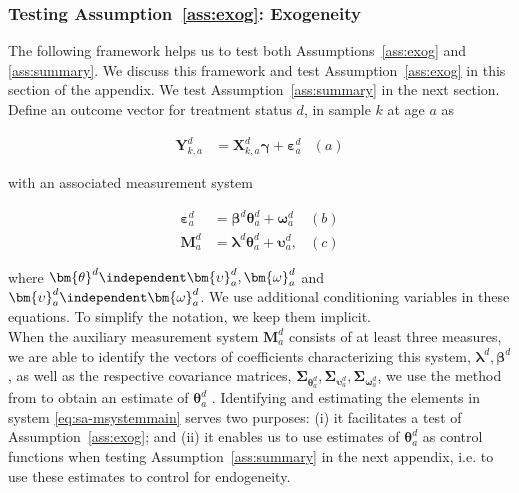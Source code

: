 \subsubsection{Testing Assumption~\ref{ass:exog}: Exogeneity} \label{app:endogeneity}

\noindent The following framework helps us to test both Assumptions~\ref{ass:exog} and \ref{ass:summary}. We discuss this framework and test Assumption~\ref{ass:exog} in this section of the appendix. We test Assumption~\ref{ass:summary} in the next section.\\

\noindent Define an outcome vector for treatment status $d$, in sample $k$ at age $a$ as

\begin{align}
\bm{Y}^d_{k,a} &= \bm{X}^d_{k,a} \bm{\gamma} + \bm{\varepsilon}^d_a  &(a) \nonumber
\end{align}

\noindent with an associated measurement system

\begin{align}  \label{eq:sa-msystemmain}
\bm{\varepsilon}_{a}^d &=\bm{\beta}^d \bm{\theta}_{a}^d + \bm{\omega}_{a}^d  &(b) \nonumber \\
\bm{M}_{a}^d &= \bm{\lambda}^d \bm{\theta}_{a}^d + \bm{\upsilon}_a^d,  &(c)
\end{align}


\noindent where $\bm{\theta}^d \independent \bm{\upsilon}_{a}^d, \bm{\omega}_{a}^d$ and $\bm{\upsilon}_{a}^d \independent \bm{\omega}_{a}^d$. We use additional conditioning variables in these equations. To simplify the notation, we keep them implicit.\\

\noindent When the auxiliary measurement system $\bm{M}_{a}^d $ consists of at least three measures, we are able to identify the vectors of coefficients characterizing this system, $\bm{\lambda}^d, \bm{\beta}^d$, as well as the respective covariance matrices, $\bm{\Sigma}_{\bm{\theta}_{a}^d}, \bm{\Sigma}_{\bm{\upsilon}_{a}^d}, \bm{\Sigma}_{\bm{\omega}_{a}^d}$, we use the method from \citet{Bartlett_1938_Nature} to obtain an estimate of $\bm{\theta}_{a}^d$ \citep{Heckman_Pinto_etal_2013_PerryFactor}. Identifying and estimating the elements in system \eqref{eq:sa-msystemmain} serves two purposes: (i) it facilitates a test of Assumption~\ref{ass:exog}; and (ii) it enables us to use estimates of $\bm{\theta}_{a}^d$ as control functions when testing Assumption~\ref{ass:summary} in the next appendix, i.e. to use these estimates to control for endogeneity.\\

